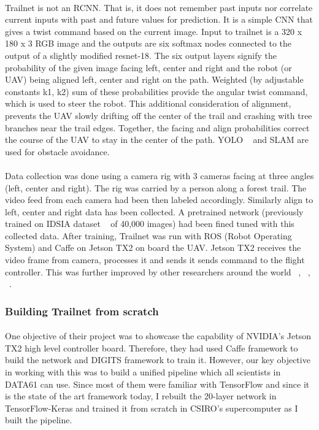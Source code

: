 \paragraph{}
Trailnet is not an RCNN. That is, it does not remember past inputs nor correlate current inputs with past and future values for prediction. It is a simple CNN that gives a twist command based on the current image. Input to trailnet is a 320 x 180 x 3 RGB image and the outputs are six softmax nodes connected to the output of a slightly modified resnet-18. The six output layers signify the probability of the given image facing left, center and right and the robot (or UAV) being aligned left, center and right on the path. Weighted (by adjustable constants k1, k2) sum of these probabilities provide the angular twist command, which is used to steer the robot. This additional consideration of alignment, prevents the UAV slowly drifting off the center of the trail and crashing with tree branches near the trail edges. Together, the facing and align probabilities correct the course of the UAV to stay in the center of the path. YOLO ~\cite{yolo} and SLAM are used for obstacle avoidance.

\paragraph{}
Data collection was done using a camera rig with 3 cameras facing at three angles (left, center and right). The rig was carried by a person along a forest trail. The video feed from each camera had been then labeled accordingly. Similarly align to left, center and right data has been collected. A pretrained network (previously trained on IDSIA dataset ~\cite{idsia} of 40,000 images) had been fined tuned with this collected data. After training, Trailnet was run with ROS (Robot Operating System) and Caffe on Jetson TX2 on board the UAV. Jetson TX2 receives the video frame from camera, processes it and sends it sends command to the flight controller. This was further improved by other researchers around the world ~\cite{trailnet2}, ~\cite{trailnet3}, ~\cite{trailnet4}.



\subsubsection{Building Trailnet from scratch}

\paragraph{}
One objective of their project was to showcase the capability of NVIDIA's Jetson TX2 high level controller board. Therefore, they had used Caffe framework to build the network and DIGITS framework to train it. However, our key objective in working with this was to build a unified pipeline which all scientists in DATA61 can use. Since most of them were familiar with TensorFlow and since it is the state of the art framework today, I rebuilt the 20-layer network in TensorFlow-Keras and trained it from scratch in CSIRO's supercomputer as I built the pipeline.

